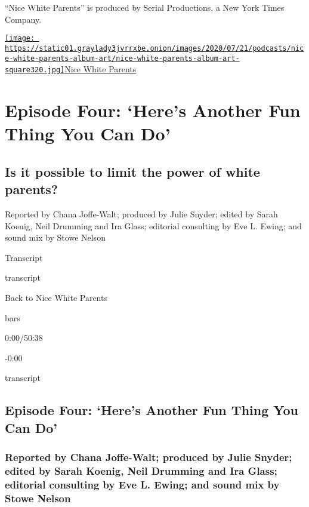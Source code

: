 ``Nice White Parents'' is produced by Serial Productions, a New York
Times Company.

\href{https://www.nytimes3xbfgragh.onion/column/nice-white-parents}{\texttt{[image: https://static01.graylady3jvrrxbe.onion/images/2020/07/21/podcasts/nice-white-parents-album-art/nice-white-parents-album-art-square320.jpg]}Nice
White Parents}

\hypertarget{episode-four-heres-another-fun-thing-you-can-do-1}{%
\section{Episode Four: `Here's Another Fun Thing You Can
Do'}\label{episode-four-heres-another-fun-thing-you-can-do-1}}

\hypertarget{is-it-possible-to-limit-the-power-of-white-parents-1}{%
\subsection{Is it possible to limit the power of white
parents?}\label{is-it-possible-to-limit-the-power-of-white-parents-1}}

Reported by Chana Joffe-Walt; produced by Julie Snyder; edited by Sarah
Koenig, Neil Drumming and Ira Glass; editorial consulting by Eve L.
Ewing; and sound mix by Stowe Nelson

Transcript

transcript

Back to Nice White Parents

bars

0:00/50:38

-0:00

transcript

\hypertarget{episode-four-heres-another-fun-thing-you-can-do-2}{%
\subsection{Episode Four: `Here's Another Fun Thing You Can
Do'}\label{episode-four-heres-another-fun-thing-you-can-do-2}}

\hypertarget{reported-by-chana-joffe-walt-produced-by-julie-snyder-edited-by-sarah-koenig-neil-drumming-and-ira-glass-editorial-consulting-by-eve-l-ewing-and-sound-mix-by-stowe-nelson-1}{%
\subsubsection{Reported by Chana Joffe-Walt; produced by Julie Snyder;
edited by Sarah Koenig, Neil Drumming and Ira Glass; editorial
consulting by Eve L. Ewing; and sound mix by Stowe
Nelson}\label{reported-by-chana-joffe-walt-produced-by-julie-snyder-edited-by-sarah-koenig-neil-drumming-and-ira-glass-editorial-consulting-by-eve-l-ewing-and-sound-mix-by-stowe-nelson-1}}

